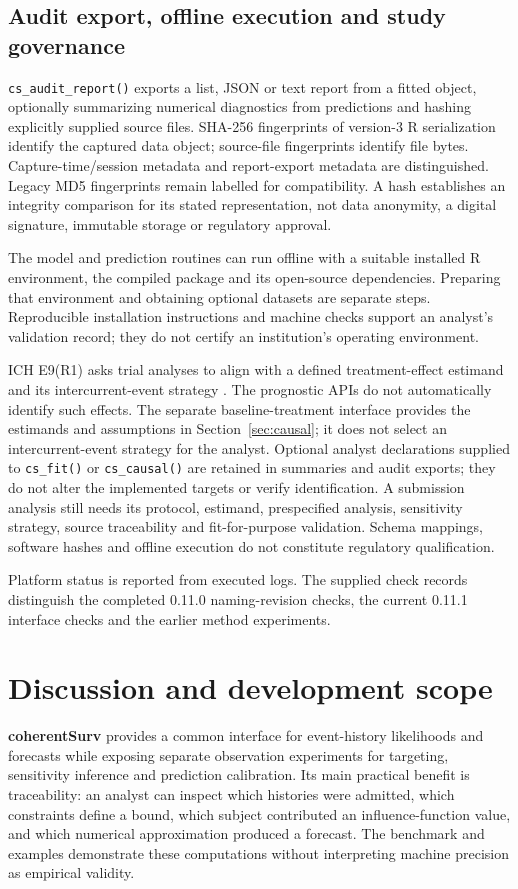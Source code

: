 \documentclass[article,nojss]{jss}
\newcommand{\pkg}[1]{\textbf{#1}}
\newcommand{\code}[1]{\texttt{#1}}
\begin{document}
\subsection{Audit export, offline execution and study governance}
\code{cs\_audit\_report()} exports a list, JSON or text report from a fitted object, optionally summarizing numerical diagnostics from predictions and hashing explicitly supplied source files. SHA-256 fingerprints of version-3 R serialization identify the captured data object; source-file fingerprints identify file bytes. Capture-time/session metadata and report-export metadata are distinguished. Legacy MD5 fingerprints remain labelled for compatibility. A hash establishes an integrity comparison for its stated representation, not data anonymity, a digital signature, immutable storage or regulatory approval.

The model and prediction routines can run offline with a suitable installed R environment, the compiled package and its open-source dependencies. Preparing that environment and obtaining optional datasets are separate steps. Reproducible installation instructions and machine checks support an analyst's validation record; they do not certify an institution's operating environment.

ICH E9(R1) asks trial analyses to align with a defined treatment-effect estimand and its intercurrent-event strategy \citep{ICHE9R1}. The prognostic APIs do not automatically identify such effects. The separate baseline-treatment interface provides the estimands and assumptions in Section~\ref{sec:causal}; it does not select an intercurrent-event strategy for the analyst. Optional analyst declarations supplied to \code{cs\_fit()} or \code{cs\_causal()} are retained in summaries and audit exports; they do not alter the implemented targets or verify identification. A submission analysis still needs its protocol, estimand, prespecified analysis, sensitivity strategy, source traceability and fit-for-purpose validation. Schema mappings, software hashes and offline execution do not constitute regulatory qualification.

Platform status is reported from executed logs. The supplied check records distinguish the completed 0.11.0 naming-revision checks, the current 0.11.1 interface checks and the earlier method experiments.



\section{Discussion and development scope}\label{sec:discussion}
\pkg{coherentSurv} provides a common interface for event-history likelihoods and forecasts while exposing separate observation experiments for targeting, sensitivity inference and prediction calibration. Its main practical benefit is traceability: an analyst can inspect which histories were admitted, which constraints define a bound, which subject contributed an influence-function value, and which numerical approximation produced a forecast. The benchmark and examples demonstrate these computations without interpreting machine precision as empirical validity.
\end{document}

